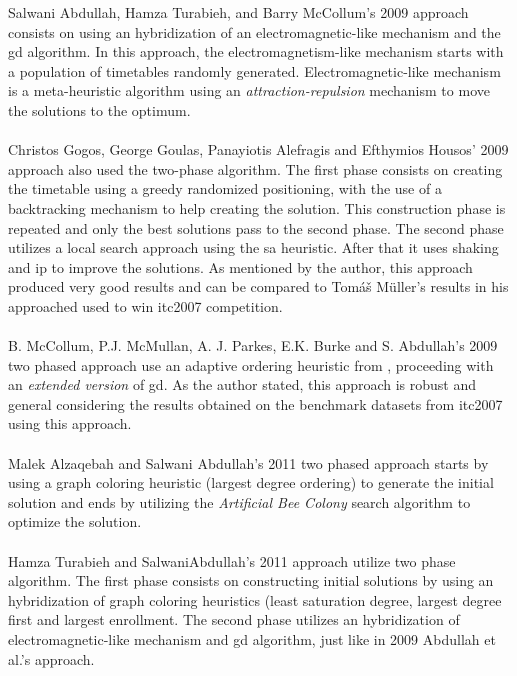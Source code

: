 Salwani Abdullah, Hamza Turabieh, and Barry McCollum's 2009 approach \cite{Abdullah2009} consists on using an hybridization of an electromagnetic-like mechanism and the \gls{gd} algorithm. In this approach, the electromagnetism-like mechanism starts with a population of timetables randomly generated. Electromagnetic-like mechanism is a meta-heuristic algorithm using an \textit{attraction-repulsion} mechanism \cite{Javadian2008} to move the solutions to the optimum.\\
\\
Christos Gogos, George Goulas, Panayiotis Alefragis and Efthymios Housos' 2009 approach \cite{Gogos2009} also used the two-phase algorithm. The first phase consists on creating the timetable using a greedy randomized positioning, with the use of a backtracking mechanism to help creating the solution. This construction phase is repeated and only the best solutions pass to the second phase. The second phase utilizes a local search approach using the \gls{sa} heuristic. After that it uses shaking and \gls{ip} to improve the solutions. As mentioned by the author, this approach produced very good results and can be compared to Tom\'{a}\v{s} M\"{u}ller's results in his approached used to win \gls{itc2007} competition.\\
\\
B. McCollum, P.J. McMullan, A. J. Parkes, E.K. Burke and S. Abdullah's 2009 two phased approach \cite{McCollum2009} use an adaptive ordering heuristic from \cite{Burke2004}, proceeding with an \textit{extended version} of \gls{gd}. As the author stated, this approach is robust and general considering the results obtained on the benchmark datasets from \gls{itc2007} using this approach.\\
\\
Malek Alzaqebah and Salwani Abdullah's 2011 two phased approach \cite{Alzaqebah2011} starts by using a graph coloring heuristic (largest degree ordering) to generate the initial solution and ends by utilizing the \textit{Artificial Bee Colony} search algorithm to optimize the solution.\\
\\
Hamza Turabieh and SalwaniAbdullah's 2011 approach \cite{Turabieh2011} utilize two phase algorithm. The first phase consists on constructing initial solutions by using an hybridization of graph coloring heuristics (least saturation degree, largest degree first and largest enrollment. The second phase utilizes an hybridization of electromagnetic-like mechanism and \gls{gd} algorithm, just like in 2009 Abdullah et al.'s approach.\\
